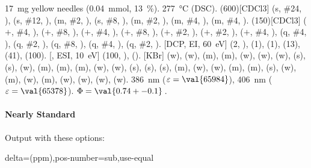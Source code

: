 \documentclass[load-preamble+]{cnltx-doc}
\begin{document}
\begin{sourcecode}
  \begin{experimental}[<optionen>]
     \SI{17}{\milli\gram} yellow needles (\SI{0.04}{\milli\mole},
      \SI{13}{\percent}).
     \SI{277}{\celsius} (DSC).
    \NMR(600)[CDCl3]  (s, \#{24}, ),  (s, \#{12},
    ),  (m, \#{2}, ),  (s, \#{8},
    ),  (m, \#{2}, ),  (m, \#{4},
    ),  (m, \#{4}, ).
    (150)[CDCl3]  ($+$, \#{4}, ),  ($+$,
    \#{8}, ),  ($+$, \#{4}, ),  ($+$, \#{8},
    ),  ($+$, \#{2}, ),  ($+$, \#{2},
    ),  ($+$, \#{4}, ),  (q, \#{4},
    ),  (q, \#{2}, ),  (q, \#{8}, ),
     (q, \#{4}, ),  (q, \#{2}, ).
    [DCP, EI, \SI{60}{\electronvolt}]  (2, ), 
    (1),  (1),  (13),  (41),  (100).
    [, ESI, \SI{10}{\electronvolt}]  (100,
    ),  ().
    [KBr]  (w),  (w),  (m), 
    (m),  (w),  (w),  (w),  (s),
     (s),  (w),  (m),  (m), 
    (m),  (w),  (w),  (s),  (s),
     (s),  (m),  (w),  (w), 
    (m),  (m),  (s),  (w),  (m), 
    (w),  (m),  (w),  (w),  (w), 
    (w).
     \SI{386}{\nano\metre} ($\varepsilon = \val{65984}$),
    \SI{406}{\nano\metre} ($\varepsilon = \val{65378}$).
     $\Phi = \val{0.74+-0.1}$\,.
  \end{experimental}
\end{sourcecode}

\paragraph{Nearly Standard}
Output with these options:

\begin{sourcecode}
  delta=(ppm),pos-number=sub,use-equal
\end{sourcecode}
\end{document}
